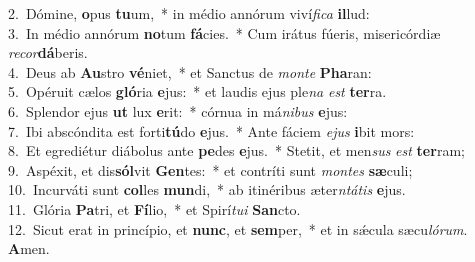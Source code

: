 {2.~}Dómine, \textbf{o}pus \textbf{tu}um,~* in médio annórum viví\textit{fi}\textit{ca} \textbf{il}lud:\\
{3.~}In médio annórum \textbf{no}tum \textbf{fá}cies.~* Cum irátus fúeris, misericórdiæ \textit{re}\textit{cor}\textbf{dá}beris.\\
{4.~}Deus ab \textbf{Au}stro \textbf{vé}niet,~* et Sanctus de \textit{mon}\textit{te} \textbf{Pha}ran:\\
{5.~}Opéruit cælos \textbf{gló}ria \textbf{e}jus:~* et laudis ejus ple\textit{na} \textit{est} \textbf{ter}ra.\\
{6.~}Splendor ejus \textbf{ut} lux \textbf{e}rit:~* córnua in má\textit{ni}\textit{bus} \textbf{e}jus:\\
{7.~}Ibi abscóndita est forti\textbf{tú}do \textbf{e}jus.~* Ante fáciem \textit{e}\textit{jus} \textbf{i}bit mors:\\
{8.~}Et egrediétur diábolus ante \textbf{pe}des \textbf{e}jus.~* Stetit, et men\textit{sus} \textit{est} \textbf{ter}ram;\\
{9.~}Aspéxit, et dis\textbf{sól}vit \textbf{Gen}tes:~* et contríti sunt \textit{mon}\textit{tes} \textbf{sæ}culi;\\
{10.~}Incurváti sunt \textbf{col}les \textbf{mun}di,~* ab itinéribus æter\textit{ntá}\textit{tis} \textbf{e}jus.\\
{11.~}Glória \textbf{Pa}tri, et \textbf{Fí}lio,~* et Spirí\textit{tu}\textit{i} \textbf{San}cto.\\
{12.~}Sicut erat in princípio, et \textbf{nunc}, et \textbf{sem}per,~* et in sǽcula sæcu\textit{ló}\textit{rum}. \textbf{A}men.\\
